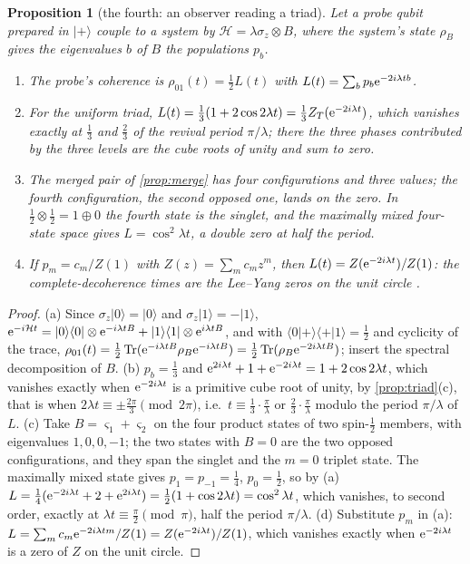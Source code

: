 \documentclass[11pt]{article}
\newtheorem{proposition}[theorem]{Proposition}
\theoremstyle{definition}\newtheorem{definition}[theorem]{Definition}
\theoremstyle{remark}\newtheorem{remark}[theorem]{Remark}
\begin{document}
\begin{proposition}[the fourth: an observer reading a triad]\label{prop:fourth}
Let a probe qubit prepared in $|{+}\rangle$ couple to a system by $\mathcal H=\lambda\sigma_z\otimes B$, where the system's state $\rho_B$ gives the eigenvalues $b$ of $B$ the populations $p_b$.
\begin{enumerate}[label=(\alph*)]
\item The probe's coherence is $\rho_{01}(t)=\frac12L(t)$ with $L(t)=\sum_bp_b\mathrm e^{-2i\lambda tb}$.
\item For the uniform triad, $L(t)=\frac13(1+2\cos2\lambda t)=\frac13Z_T(\mathrm e^{-2i\lambda t})$, which vanishes exactly at $\frac13$ and $\frac23$ of the revival period $\pi/\lambda$; there the three phases contributed by the three levels are the cube roots of unity and sum to zero.
\item The merged pair of \cref{prop:merge} has four configurations and three values; the fourth configuration, the second opposed one, lands on the zero. In $\frac12\otimes\frac12=1\oplus0$ the fourth state is the singlet, and the maximally mixed four-state space gives $L=\cos^2\lambda t$, a double zero at half the period.
\item If $p_m=c_m/Z(1)$ with $Z(z)=\sum_mc_mz^m$, then $L(t)=Z(\mathrm e^{-2i\lambda t})/Z(1)$: the complete-decoherence times are the Lee--Yang zeros on the unit circle \cite{WeiLiu}.
\end{enumerate}
\end{proposition}
\begin{proof}
(a) Since $\sigma_z|0\rangle=|0\rangle$ and $\sigma_z|1\rangle=-|1\rangle$, $\mathrm e^{-i\mathcal Ht}=|0\rangle\langle0|\otimes\mathrm e^{-i\lambda tB}+|1\rangle\langle1|\otimes\mathrm e^{i\lambda tB}$, and with $\langle0|{+}\rangle\langle{+}|1\rangle=\frac12$ and cyclicity of the trace, $\rho_{01}(t)=\frac12\operatorname{Tr}(\mathrm e^{-i\lambda tB}\rho_B\mathrm e^{-i\lambda tB})=\frac12\operatorname{Tr}(\rho_B\mathrm e^{-2i\lambda tB})$; insert the spectral decomposition of $B$. (b) $p_b=\frac13$ and $\mathrm e^{2i\lambda t}+1+\mathrm e^{-2i\lambda t}=1+2\cos2\lambda t$, which vanishes exactly when $\mathrm e^{-2i\lambda t}$ is a primitive cube root of unity, by \cref{prop:triad}(c), that is when $2\lambda t\equiv\pm\frac{2\pi}3\pmod{2\pi}$, i.e.\ $t\equiv\frac13\cdot\frac\pi\lambda$ or $\frac23\cdot\frac\pi\lambda$ modulo the period $\pi/\lambda$ of $L$. (c) Take $B=\varsigma_1+\varsigma_2$ on the four product states of two spin-$\frac12$ members, with eigenvalues $1,0,0,-1$; the two states with $B=0$ are the two opposed configurations, and they span the singlet and the $m=0$ triplet state. The maximally mixed state gives $p_1=p_{-1}=\frac14$, $p_0=\frac12$, so by (a) $L=\frac14(\mathrm e^{-2i\lambda t}+2+\mathrm e^{2i\lambda t})=\frac12(1+\cos2\lambda t)=\cos^2\lambda t$, which vanishes, to second order, exactly at $\lambda t\equiv\frac\pi2\pmod\pi$, half the period $\pi/\lambda$. (d) Substitute $p_m$ in (a): $L=\sum_mc_m\mathrm e^{-2i\lambda tm}/Z(1)=Z(\mathrm e^{-2i\lambda t})/Z(1)$, which vanishes exactly when $\mathrm e^{-2i\lambda t}$ is a zero of $Z$ on the unit circle.
\end{proof}
\end{document}
